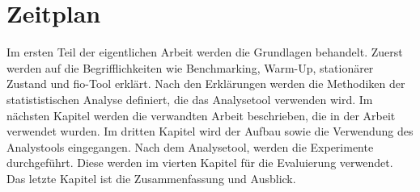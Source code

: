 \documentclass{article}
\begin{document}
\section{Zeitplan}
Im ersten Teil der eigentlichen Arbeit werden die Grundlagen behandelt.
 Zuerst werden auf die Begrifflichkeiten wie Benchmarking, Warm-Up,
stationärer Zustand und fio-Tool erklärt. Nach den Erklärungen werden die Methodiken
der statististischen Analyse definiert, die das  Analysetool verwenden wird.
Im nächsten Kapitel werden die verwandten Arbeit beschrieben, die in
der Arbeit verwendet wurden. Im dritten Kapitel wird der Aufbau sowie die
Verwendung des Analystools eingegangen. Nach dem Analysetool, werden die
Experimente durchgeführt. Diese werden im vierten Kapitel für die Evaluierung
verwendet. Das letzte Kapitel ist die Zusammenfassung und Ausblick.
\newpage
{}

\end{document}
